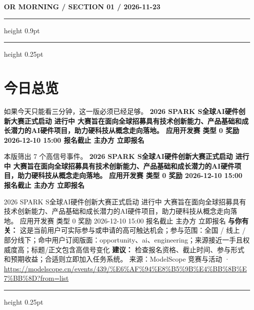 \documentclass[10.5pt]{ctexart}
\begin{document}
{\small\bfseries OR MORNING / SECTION 01 / 2026-11-23}
\vspace{2mm}
\hrule height 0.9pt
\vspace{1.5mm}
\hrule height 0.25pt
\vspace{4mm}
\section*{今日总览}
{\color{ormuted} 如果今天只能看三分钟，这一版必须已经足够。}
\vspace{2mm}
{\fontsize{25}{29}\selectfont\bfseries 2026 SPARK S全球AI硬件创新大赛正式启动 进行中 大赛旨在面向全球招募具有技术创新能力、产品基础和成长潜力的AI硬件项目，助力硬科技从概念走向落地。 应用开发赛 类型 0 奖励 2026-12-10 15:00 报名截止 主办方 立即报名}\par
\vspace{2mm}
{\large 本版筛出 7 个高信号事件。}
\vspace{3mm}
{\Large\bfseries 2026 SPARK S全球AI硬件创新大赛正式启动 进行中 大赛旨在面向全球招募具有技术创新能力、产品基础和成长潜力的AI硬件项目，助力硬科技从概念走向落地。 应用开发赛 类型 0 奖励 2026-12-10 15:00 报名截止 主办方 立即报名}\par
2026 SPARK S全球AI硬件创新大赛正式启动 进行中 大赛旨在面向全球招募具有技术创新能力、产品基础和成长潜力的AI硬件项目，助力硬科技从概念走向落地。 应用开发赛 类型 0 奖励 2026-12-10 15:00 报名截止 主办方 立即报名
\textbf{与你有关：} 这是当前用户可实际参与或申请的高可触达机会；参与范围：全国 / 线上 / 部分线下；命中用户订阅版面：opportunity、ai、engineering；来源接近一手且权威度高；标题/正文包含高信号变化
\textbf{建议：} 检查报名资格、截止时间、参与形式和预期收益；合适则立即加入任务系统。
{\footnotesize\color{ormuted} 来源：ModelScope 竞赛与活动 · \url{https://modelscope.cn/events/439/%E6%AF%94%E8%B5%9B%E4%BB%8B%E7%BB%8D?from=list}}
\vspace{3mm}
\hrule height 0.25pt
\vspace{3mm}
\end{document}
